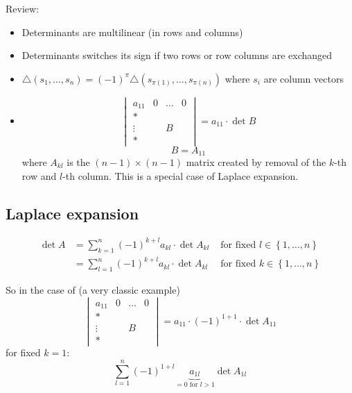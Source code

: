 \documentclass{article}
\newcommand{\set}[1]{\left\{#1\right\}}
\begin{document}
Review:
\begin{itemize}
  \item Determinants are multilinear (in rows and columns)
  \item Determinants switches its sign if two rows or row columns are exchanged
  \item $\triangle(s_1, \dots, s_n) = (-1)^\pi \triangle(s_{\pi(1)}, \dots, s_{\pi(n)})$ where $s_i$ are column vectors
  \item
    \[
      \begin{vmatrix}
        a_{11} & 0 & \dots & 0 \\
        * &        &       & \\
        \vdots &   &  B    & \\
        * &        &       &
      \end{vmatrix}
      = a_{11} \cdot \det{B}
    \] \[
      B = A_{11}
    \]
    where $A_{kl}$ is the $(n-1) \times (n-1)$ matrix created by removal of the $k$-th row and $l$-th column.
    This is a special case of Laplace expansion.
\end{itemize}

\subsection{Laplace expansion}
\begin{align*}
  \det{A} &= \sum_{k=1}^n (-1)^{k+l} a_{kl} \cdot \det{A_{kl}} & \text{ for fixed } l \in \set{1, \dots, n} \\
          &= \sum_{l=1}^n (-1)^{k+l} a_{kl} \cdot \det{A_{kl}} & \text{ for fixed } k \in \set{1, \dots, n}
\end{align*}

So in the case of (a very classic example)
\[
  \begin{vmatrix}
    a_{11} & 0 & \dots & 0 \\
    * &        &       & \\
    \vdots &   &  B    & \\
    * &        &       &
  \end{vmatrix}
  = a_{11} \cdot (-1)^{1 + 1} \cdot \det{A_{11}}
\]
for fixed $k=1$:
\[ \sum_{l=1}^n (-1)^{1 + l} \underbrace{a_{1l}}_{=0 \text{ for } l > 1} \det{A_{1l}} \]
\end{document}
